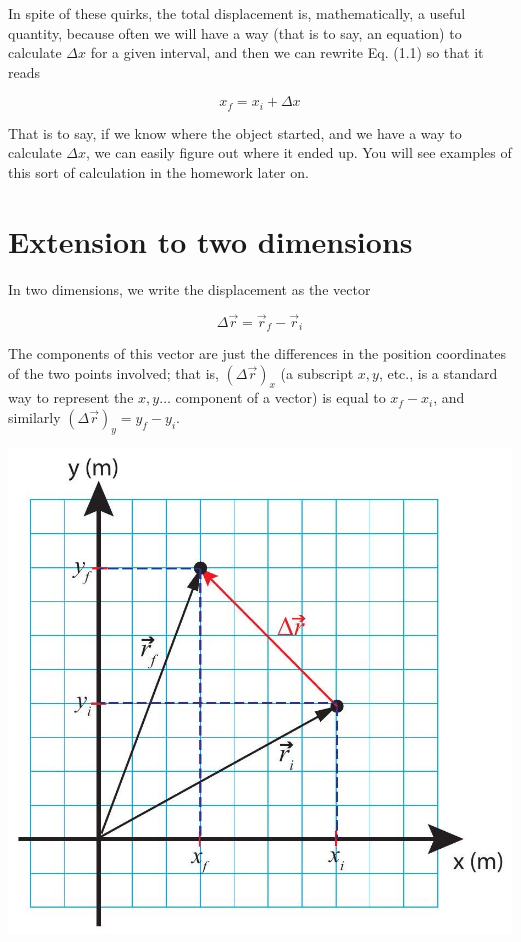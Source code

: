 \documentclass[10pt]{article}
\begin{document}
In spite of these quirks, the total displacement is, mathematically, a useful quantity, because often we will have a way (that is to say, an equation) to calculate $\Delta x$ for a given interval, and then we can rewrite Eq. (1.1) so that it reads


\begin{equation*}
x_{f}=x_{i}+\Delta x \tag{1.3}
\end{equation*}


That is to say, if we know where the object started, and we have a way to calculate $\Delta x$, we can easily figure out where it ended up. You will see examples of this sort of calculation in the homework later on.

\section*{Extension to two dimensions}
In two dimensions, we write the displacement as the vector


\begin{equation*}
\Delta \vec{r}=\vec{r}_{f}-\vec{r}_{i} \tag{1.4}
\end{equation*}


The components of this vector are just the differences in the position coordinates of the two points involved; that is, $(\Delta \vec{r})_{x}$ (a subscript $x, y$, etc., is a standard way to represent the $x, y \ldots$ component of a vector) is equal to $x_{f}-x_{i}$, and similarly $(\Delta \vec{r})_{y}=y_{f}-y_{i}$.

\begin{center}
\includegraphics[max width=\textwidth]{2024_09_14_9969b06773f10b6936e8g-026}
\end{center}
\end{document}
